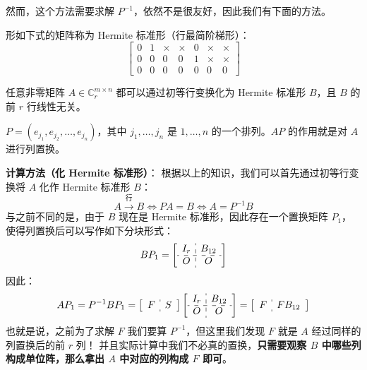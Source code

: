 \vskip 6pt 然而，这个方法需要求解 $P^{-1}$，依然不是很友好，因此我们有下面的方法。

\begin{definition}
形如下式的矩阵称为 Hermite 标准形（行最简阶梯形）：
\[
    \begin{bmatrix}
    0&1&\times&\times&0&\times&\times\\
    0&0&0&0&1&\times&\times\\
    0&0&0&0&0&0&0
    \end{bmatrix}
\]
\end{definition}

\begin{theorem}
任意非零矩阵 $A\in\mathbb C^{m\times n}_r$ 都可以通过初等行变换化为 Hermite 标准形 $B$，且 $B$ 的前 $r$ 行线性无关。
\end{theorem}

\begin{definition}[列置换矩阵]
$P=(e_{j_1},e_{j_2},\ldots,e_{j_n})$，其中 $j_1,\ldots,j_n$ 是 $1,\ldots,n$ 的一个排列。$AP$ 的作用就是对 $A$ 进行列置换。
\end{definition}

\vskip 6pt \noindent\textbf{计算方法（化 Hermite 标准形）}：
根据以上的知识，我们可以首先通过初等行变换将 $A$ 化作 Hermite 标准形 $B$：
\[
    A\xrightarrow{\text{行}}B\iff PA=B\iff A=P^{-1}B
\]
与之前不同的是，由于 $B$ 现在是 Hermite 标准形，因此存在一个置换矩阵 $P_1$，使得列置换后可以写作如下分块形式：
\[
    BP_1=\left[\begin{array}{c:c}I_r&B_{12}\\\hdashline O&O\end{array}\right]
\]
因此：
\[
    AP_1=P^{-1}BP_1=\left[\begin{array}{c:c}F&S\end{array}\right]\left[\begin{array}{c:c}I_r&B_{12}\\\hdashline O&O\end{array}\right]=\left[\begin{array}{c:c}F&FB_{12}\end{array}\right]
\]
也就是说，之前为了求解 $F$ 我们要算 $P^{-1}$，但这里我们发现 $F$ 就是 $A$ 经过同样的列置换后的前 $r$ 列！
并且实际计算中我们不必真的置换，\textbf{只需要观察 $B$ 中哪些列构成单位阵，那么拿出 $A$ 中对应的列构成 $F$ 即可}。

